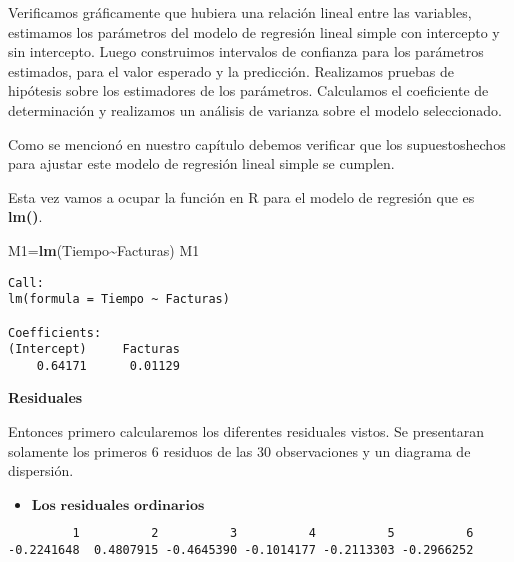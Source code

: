 \documentclass[
  a4paper,
  oneside,
  openany]{book}
\newenvironment{Shaded}{\begin{snugshade}}{\end{snugshade}}
\newcommand{\KeywordTok}[1]{\textcolor[rgb]{0.13,0.29,0.53}{\textbf{#1}}}
\newcommand{\NormalTok}[1]{#1}
\newcommand{\OperatorTok}[1]{\textcolor[rgb]{0.81,0.36,0.00}{\textbf{#1}}}
\providecommand{\tightlist}{%
  \setlength{\itemsep}{0pt}\setlength{\parskip}{0pt}}
\begin{document}
Verificamos gráficamente que hubiera una relación lineal entre las variables, estimamos los parámetros del modelo de regresión lineal simple con intercepto y sin intercepto. Luego construimos intervalos de confianza para los parámetros estimados, para el valor esperado y la predicción. Realizamos pruebas de hipótesis sobre los estimadores de los parámetros. Calculamos el coeficiente de determinación y realizamos un análisis de varianza sobre el modelo seleccionado.

Como se mencionó en nuestro capítulo debemos verificar que los supuestoshechos para ajustar este modelo de regresión lineal simple se cumplen.

Esta vez vamos a ocupar la función en R para el modelo de regresión que es \textbf{lm()}.

\begin{Shaded}
\begin{Highlighting}[]
\NormalTok{M1=}\KeywordTok{lm}\NormalTok{(Tiempo}\OperatorTok{\textasciitilde{}}\NormalTok{Facturas)}
\NormalTok{M1}
\end{Highlighting}
\end{Shaded}

\begin{verbatim}
Call:
lm(formula = Tiempo ~ Facturas)

Coefficients:
(Intercept)     Facturas  
    0.64171      0.01129  
\end{verbatim}

\textbf{Residuales}

Entonces primero calcularemos los diferentes residuales vistos. Se presentaran solamente los primeros 6 residuos de las 30 observaciones y un diagrama de dispersión.

\begin{itemize}
\tightlist
\item
  \(\textbf{Los residuales ordinarios}\)
\end{itemize}

\begin{Shaded}
\end{Shaded}

\begin{verbatim}
         1          2          3          4          5          6 
-0.2241648  0.4807915 -0.4645390 -0.1014177 -0.2113303 -0.2966252 
\end{verbatim}
\end{document}
